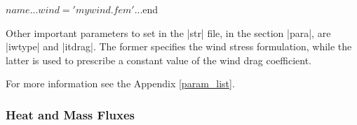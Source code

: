 \begin{code}
$name
...
wind = 'mywind.fem'
...
$end
\end{code}

Other important parameters to set in the |str| file, in the section
|para|, are |iwtype| and |itdrag|. The former specifies the wind stress
formulation, while the latter is used to prescribe a constant value of
the wind drag coefficient.

For more information see the Appendix \ref{param_list}.


\subsubsection{Heat and Mass Fluxes}









